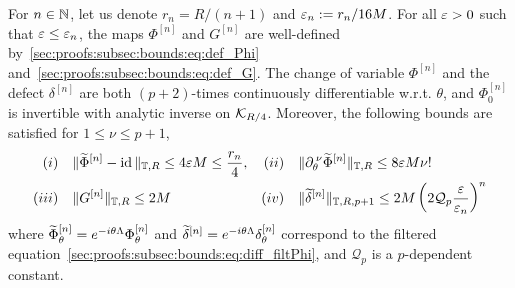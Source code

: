 \begin{theorem}
  \label{approx-thm:period_bounds} For $n \in \mathbb{N}$, let us denote $r_n =
  R/(n+1)	$ and $\varepsilon_n := r_n/16 M$. For all $\varepsilon > 0$ such that
  $\varepsilon \leq \varepsilon_n$, the maps $\Phi^{[n]}$ and $G^{[n]}$ are well-defined
  by~\eqref{sec:proofs:subsec:bounds:eq:def_Phi}
  and~\eqref{sec:proofs:subsec:bounds:eq:def_G}. The change of variable
  $\Phi^{[n]}$ and the defect $\delta^{[n]}$ are both $(p+2)$-times
  continuously differentiable w.r.t. $\theta$, and $\Phi_0^{[n]}$ is
  invertible with analytic inverse on $\mathcal{K}_{R/4}$. Moreover, the following
  bounds are satisfied for $1 \leq \nu \leq p+1$,
  \begin{align*}
    (i)\quad{}&{} \| \widetilde{\Phi}^{[n]} - \operatorname{id} \|_{\mathbb{T}, R} 
    \leq 4\varepsilon M \leq \frac{r_n}{4} ,
    &  
    (ii)\quad{}&{} \|\partial_{\theta}^{\:\nu} \widetilde{\Phi}^{[n]} \|_{\mathbb{T}, R} 
    \leq 8\varepsilon M \nu! 
    \\
    (iii)\quad{}&{} \| G^{[n]} \|_{\mathbb{T}, R} \leq 2M 
    & 
    (iv)\quad{}&{} \|\widetilde{\delta}^{[n]} \|_{\mathbb{T}, R,p+1} 
    \leq 2M \left( 2\mathcal Q_p \frac{\varepsilon}{\varepsilon_n} \right)^n 
  \end{align*}
  where $\widetilde{\Phi}^{[n]}_{\theta} =
  e^{-i\theta\Lambda}\Phi^{[n]}_{\theta}$ and $\widetilde{\delta}^{[n]} = 
  e^{-i\theta\Lambda}\delta^{[n]}_{\theta}$ correspond to the filtered
  equation~\eqref{sec:proofs:subsec:bounds:eq:diff_filtPhi}, and 
  $\mathcal Q_{p}$ is a $p$-dependent constant. 
\end{theorem}

